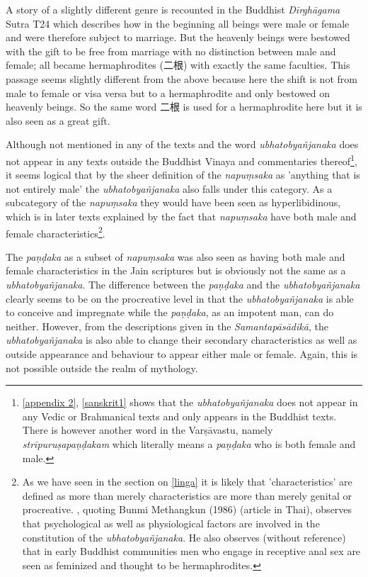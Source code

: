 A story of a slightly different genre is recounted in the Buddhist {\em Dīrghāgama} Sutra T24 which describes how in the beginning all beings were male or female and were therefore subject to marriage. But the heavenly beings were bestowed with the gift to be free from marriage with no distinction between male and female; all became hermaphrodites (二根) with exactly the same faculties. This passage seems slightly different from the above because here the shift is not from male to female or visa versa but to a hermaphrodite and only bestowed on heavenly beings. So the same word 二根 is used for a hermaphrodite here but it is also seen as a great gift.

Although not mentioned in any of the texts and the word {\em ubhatob­yañ­janaka} does not appear in any texts outside the Buddhist Vinaya and commentaries thereof\footnote{\ref{appendix 2}, \ref{sanskrit1} shows that the {\em ubhatob­yañ­janaka} does not appear in any Vedic or Brahmanical texts and only appears in the Buddhist texts. There is however another word in the {\m Varṣāvastu}, namely {\em strīpuruṣapaṇḍakam} which literally means a {\em paṇḍaka} who is both female and male.}, it seems logical that by the sheer definition of the {\em napuṃsaka} as 'anything that is not entirely male' the {\em ubhatob­yañ­janaka} also falls under this category. As a subcategory of the {\em napuṃsaka} they would have been seen as hyperlibidinous, which is in later texts explained by the fact that {\em napuṃsaka} have both male and female characteristics\footnote{As we have seen in the section on \ref{linga} it is likely that 'characteristics' are defined as more than merely characteristics are more than merely genital or procreative. \cite{jackson}, quoting Bunmi Methangkun (1986) (article in Thai), observes that psychological as well as physiological factors are involved in the constitution of the {\em ubhatob­yañ­janaka}. He also observes (without reference) that in early Buddhist communities men who engage in receptive anal sex are seen as feminized and thought to be hermaphrodites.}. 

The {\em paṇḍaka} as a subset of {\em napuṃsaka} was also seen as having both male and female characteristics in the Jain scriptures but is obviously not the same as a {\em ubhatob­yañ­janaka}. The difference between the {\em paṇḍaka} and the {\em ubhatob­yañ­janaka} clearly seems to be on the procreative level in that the {\em ubhatob­yañ­janaka} is able to conceive and impregnate while the {\em paṇḍaka}, as an impotent man, can do neither. However, from the descriptions given in the {\em Samantapāsādikā}, the {\em ubhatob­yañ­janaka} is also able to change their secondary characteristics as well as outside appearance and behaviour to appear either male or female. Again, this is not possible outside the realm of mythology.

